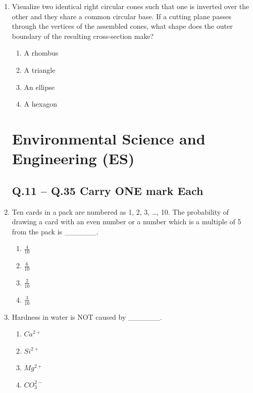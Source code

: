 \documentclass[journal]{IEEEtran}
\begin{document}
\begin{enumerate}
\begin{enumerate}
\end{enumerate}

\item Visualize two identical right circular cones such that one is inverted over the other and they share a common circular base. If a cutting plane passes through the vertices of the assembled cones, what shape does the outer boundary of the resulting cross-section make?
\hfill{}

\begin{multicols}{2}
\begin{enumerate}
\item A rhombus
\item A triangle
\item An ellipse
\item A hexagon
\end{enumerate}
\end{multicols}

\section*{Environmental Science and Engineering (ES)}

\subsection*{Q.11 -- Q.35 Carry ONE mark Each}

\item Ten cards in a pack are numbered as 1, 2, 3, \dots, 10. The probability of drawing a card with an even number or a number which is a multiple of 5 from the pack is \_\_\_\_\_\_.
\hfill{}

\begin{multicols}{2}
\begin{enumerate}
\item $\frac{4}{10}$
\item $\frac{6}{10}$
\item $\frac{2}{10}$
\item $\frac{3}{10}$
\end{enumerate}
\end{multicols}

\item Hardness in water is NOT caused by \_\_\_\_\_\_.
\hfill{}

\begin{multicols}{2}
\begin{enumerate}
\item $Ca^{2+}$
\item $Si^{2+}$
\item $Mg^{2+}$
\item $CO_3^{2-}$
\end{enumerate}
\end{multicols}


\end{enumerate}
\end{document}
